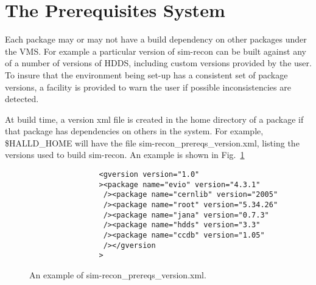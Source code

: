 \documentclass[12pt]{article}
\begin{document}
\section{The Prerequisites System}\label{section:prerequisites-system}

Each package may or may not have a build dependency on other packages
under the VMS. For example a particular version of sim-recon can be
built against any of a number of versions of HDDS, including custom
versions provided by the user. To insure that the environment being
set-up has a consistent set of package versions, a facility is
provided to warn the user if possible inconsistencies are detected.

At build time, a version xml file is created in the home directory of
a package if that package has dependencies on others in the
system. For example, \$HALLD\_HOME will have the file
sim-recon\_prereqs\_version.xml, listing the versions used to build
sim-recon. An example is shown in Fig.~\ref{figure:prereqs-xml-file}

\begin{figure}
\begin{verbatim}
                <gversion version="1.0"
                ><package name="evio" version="4.3.1"
                 /><package name="cernlib" version="2005"
                 /><package name="root" version="5.34.26"
                 /><package name="jana" version="0.7.3"
                 /><package name="hdds" version="3.3"
                 /><package name="ccdb" version="1.05"
                 /></gversion
                >
\end{verbatim}
\caption{An example of sim-recon\_prereqs\_version.xml.}\label{figure:prereqs-xml-file}
\end{figure}
\end{document}
